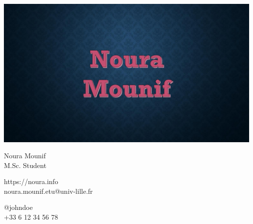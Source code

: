 \documentclass{article}
\begin{document}
\centering \includegraphics[width=.25\linewidth]{logo}\\[5pt]
\parbox{2in}{\Large \centering Noura Mounif\\[1pt]
\normalsize M.Sc. Student}

\vfill
\raggedright
\begin{multicols}{2}
https://noura.info\\
noura.mounif.etu@univ-lille.fr

\columnbreak
\raggedleft
@johndoe\\
+33 6 12 34 56 78%
\end{multicols}%
\end{document}
